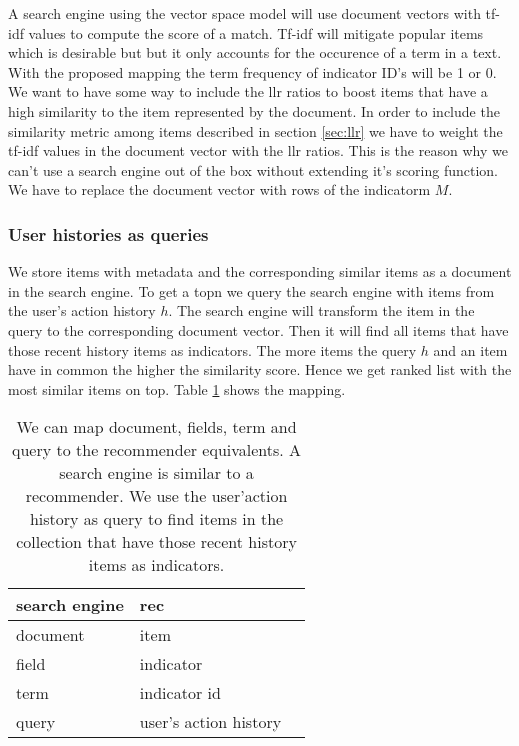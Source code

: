 A search engine using the vector space model will use document vectors with tf-idf values to compute the score of a match. Tf-idf will mitigate popular items which is desirable but but it only accounts for the occurence of a term in a text. With the proposed mapping the term frequency of indicator ID's will be 1 or 0. We want to have some way to include the \gls{llr} ratios to boost items that have a high similarity to the item represented by the document. In order to include the similarity metric among items described in section \ref{sec:llr} we have to weight the tf-idf values in the document vector with the \gls{llr} ratios. This is the reason why we can't use a search engine out of the box without extending it's scoring function.
We have to replace the document vector with rows of the \gls{indicatorm} $M$. 

\subsubsection{User histories as queries}
We store items with metadata and the corresponding similar items as a document in the search engine. To get a \gls{topn} we query the search engine with items from the user's action history $h$. The search engine will transform the item in the query to the corresponding document vector. Then it will find all items that have those recent history items as indicators. The more items the query $h$ and an item have in common the higher the similarity score. Hence we get ranked list with the most similar items on top. Table \ref{tbl:comparison} shows the mapping.

\begin{table}
\begin{center}
\begin{tabular}{lll}
 search engine & \gls{rec}\\ \hline
  document & item\\ 
 field & indicator \\
 term & indicator id    \\
 query & user's action history \\
\end{tabular}
\end{center}
\caption{We can map document, fields, term and query to the recommender equivalents. A search engine is similar to a recommender. We use the user'action history as query to find items in the collection that have those recent history items as indicators. }
\label{tbl:comparison}
\end{table}

